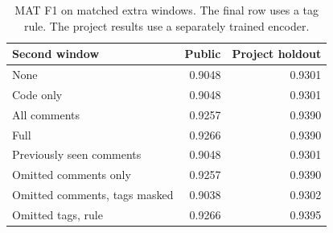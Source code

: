 \begin{table}[t]
\centering
\small\setlength{\tabcolsep}{3pt}
\caption{MAT F1 on matched extra windows. The final row uses a tag rule. The project results use a separately trained encoder.}
\label{tab:masking}
\begin{tabular}{lrr}
\toprule
Second window & Public & Project holdout \\
\midrule
None & 0.9048 & 0.9301 \\
Code only & 0.9048 & 0.9301 \\
All comments & 0.9257 & 0.9390 \\
Full & 0.9266 & 0.9390 \\
Previously seen comments & 0.9048 & 0.9301 \\
Omitted comments only & 0.9257 & 0.9390 \\
Omitted comments, tags masked & 0.9038 & 0.9302 \\
Omitted tags, rule & 0.9266 & 0.9395 \\
\bottomrule
\end{tabular}
\end{table}
